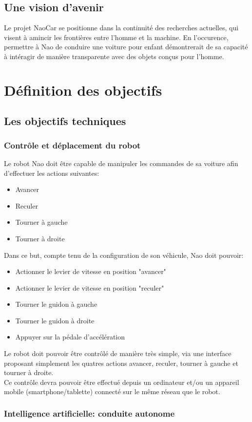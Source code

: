 \documentclass[11pt]{report} %
\begin{document}
	\section{Une vision d'avenir}
			Le projet NaoCar se positionne dans la continuité des recherches actuelles, qui visent à amincir les frontières entre l'homme et la machine. En l'occurence, permettre à Nao de conduire une voiture pour enfant démontrerait de sa capacité à intéragir de manière transparente avec des objets conçus pour l'homme.
\chapter{Définition des objectifs}
	\section{Les objectifs techniques}
		\subsection{Contrôle et déplacement du robot}
			Le robot Nao doit être capable de manipuler les commandes de sa voiture afin d'effectuer les actions suivantes:
\begin{itemize}
\item Avancer
\item Reculer
\item Tourner à gauche
\item Tourner à droite
\end{itemize}
			Dans ce but, compte tenu de la configuration de son véhicule, Nao doit pouvoir:
\begin{itemize}
\item Actionner le levier de vitesse en position "avancer"
\item Actionner le levier de vitesse en position "reculer"
\item Tourner le guidon à gauche
\item Tourner le guidon à droite
\item Appuyer sur la pédale d'accélération
\end{itemize}
			Le robot doit pouvoir être contrôlé de manière très simple, via une interface proposant simplement les quatres actions avancer, reculer, tourner à gauche et tourner à droite.\\
			Ce contrôle devra pouvoir être effectué depuis un ordinateur et/ou un appareil mobile (smartphone/tablette) connecté sur le même réseau que le robot.
		\subsection{Intelligence artificielle: conduite autonome}
\end{document}
